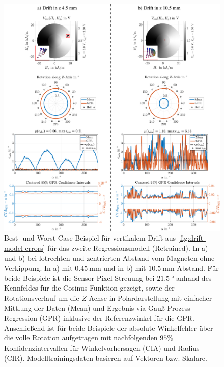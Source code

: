 \clearpage
\begin{figure}[tbph]
	\centering
	\includegraphics[width=\linewidth]{chapters/images/4-EuOExp/Z-Pos-Comp-45-105-Rotation}
	\caption[Best- und Worst-Case-Beispiel bei vertikalem Drift]{Best- und Worst-Case-Beispiel für vertikalem Drift aus \autoref{fig:drift-model-errors} für das zweite Regressionsmodell (Retrained). In a) und b) bei lotrechten und zentrierten Abstand vom Magneten ohne Verkippung. In a) mit $\SI{0,45}{\milli\metre}$ und in b) mit $\SI{10,5}{\milli\metre}$ Abstand. Für beide Beispiele ist die Sensor-Pixel-Streuung bei $\SI{21,5}{\degree}$ anhand des Kennfeldes für die Cosinus-Funktion gezeigt, sowie der Rotationsverlauf um die $Z$-Achse in Polardarstellung mit einfacher Mittlung der Daten (Mean) und Ergebnis via Gauß-Prozess-Regression (GPR) inklusive der Referenzwinkel für die GPR. Anschließend ist für beide Beispiele der absolute Winkelfehler über die volle Rotation aufgetragen mit nachfolgenden $95\%$ Konfidenzintervallen für Winkelvorhersagen (CIA) und Radius (CIR). Modelltrainingsdaten basieren auf Vektoren bzw. Skalare.}
	\label{fig:z-pos-comp-45-105-rotation}
\end{figure}


\clearpage

